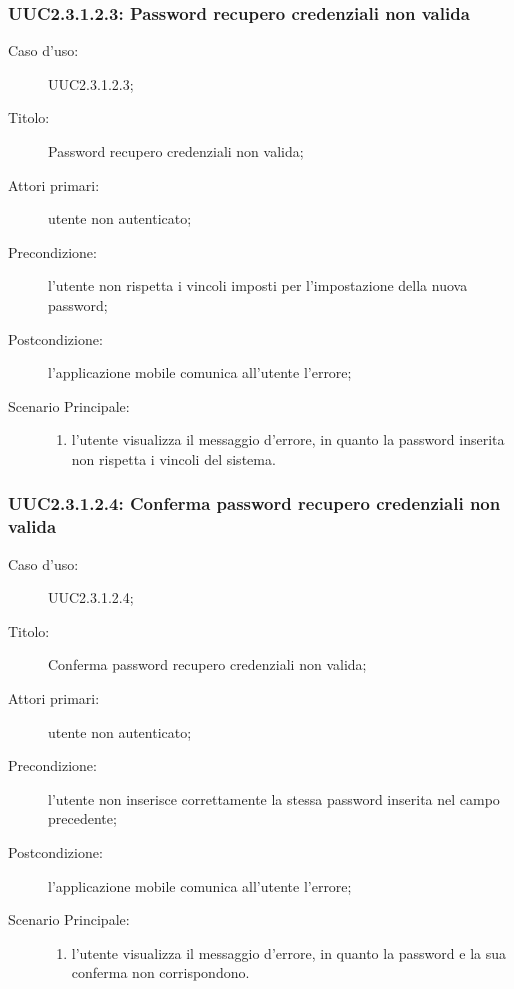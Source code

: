\documentclass[../../../analisi-dei-requisiti.tex]{subfiles}
\begin{document}
\subsubsection{UUC2.3.1.2.3: Password recupero credenziali non valida}%
\label{subs:UUC2.3.1.2.3}
\begin{description}
  \item[Caso d’uso:] UUC2.3.1.2.3;
  \item[Titolo:] Password recupero credenziali non valida;
  \item[Attori primari:] utente non autenticato;
  \item[Precondizione:] l'utente non rispetta i vincoli imposti per l'impostazione della nuova password;
  \item[Postcondizione:] l'applicazione mobile comunica all'utente l'errore;
  \item[Scenario Principale:]
        \begin{enumerate}
          \item l'utente visualizza il messaggio d'errore, in quanto la password inserita non rispetta i vincoli del sistema.
        \end{enumerate}
\end{description}

\subsubsection{UUC2.3.1.2.4: Conferma password recupero credenziali non valida}%
\label{subs:UUC2.3.1.2.4}
\begin{description}
  \item[Caso d’uso:] UUC2.3.1.2.4;
  \item[Titolo:] Conferma password recupero credenziali non valida;
  \item[Attori primari:] utente non autenticato;
  \item[Precondizione:] l'utente non inserisce correttamente la stessa password inserita nel campo precedente;
  \item[Postcondizione:] l'applicazione mobile comunica all'utente l'errore;
  \item[Scenario Principale:]
        \begin{enumerate}
          \item l'utente visualizza il messaggio d'errore, in quanto la password e la sua conferma non corrispondono.
        \end{enumerate}
\end{description}
\end{document}
